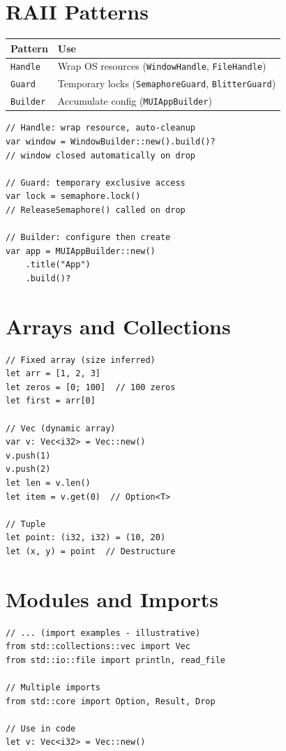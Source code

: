 \section{RAII Patterns}

\begin{center}
\begin{tabular}{lp{6.5cm}}
\textbf{Pattern} & \textbf{Use} \\
\hline
\texttt{Handle} & Wrap OS resources (\texttt{WindowHandle}, \texttt{FileHandle}) \\
\texttt{Guard} & Temporary locks (\texttt{SemaphoreGuard}, \texttt{BlitterGuard}) \\
\texttt{Builder} & Accumulate config (\texttt{MUIAppBuilder}) \\
\end{tabular}
\end{center}

\begin{lstlisting}
// Handle: wrap resource, auto-cleanup
var window = WindowBuilder::new().build()?
// window closed automatically on drop

// Guard: temporary exclusive access
var lock = semaphore.lock()
// ReleaseSemaphore() called on drop

// Builder: configure then create
var app = MUIAppBuilder::new()
    .title("App")
    .build()?
\end{lstlisting}

\section{Arrays and Collections}

\begin{lstlisting}
// Fixed array (size inferred)
let arr = [1, 2, 3]
let zeros = [0; 100]  // 100 zeros
let first = arr[0]

// Vec (dynamic array)
var v: Vec<i32> = Vec::new()
v.push(1)
v.push(2)
let len = v.len()
let item = v.get(0)  // Option<T>

// Tuple
let point: (i32, i32) = (10, 20)
let (x, y) = point  // Destructure
\end{lstlisting}

\section{Modules and Imports}

\begin{lstlisting}
// ... (import examples - illustrative)
from std::collections::vec import Vec
from std::io::file import println, read_file

// Multiple imports
from std::core import Option, Result, Drop

// Use in code
let v: Vec<i32> = Vec::new()
\end{lstlisting}

